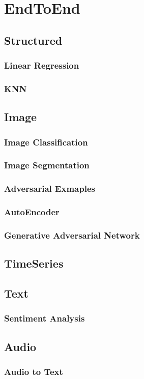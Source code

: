 \chapter{EndToEnd}

\section{Structured}

\subsection{Linear Regression}

\subsection{KNN}

\section{Image}

\subsection{Image Classification}

\subsection{Image Segmentation}

\subsection{Adversarial Exmaples}

\subsection{AutoEncoder}

\subsection{Generative Adversarial Network}

\section{TimeSeries}

\section{Text}

\subsection{Sentiment Analysis}

\section{Audio}

\subsection{Audio to Text}

